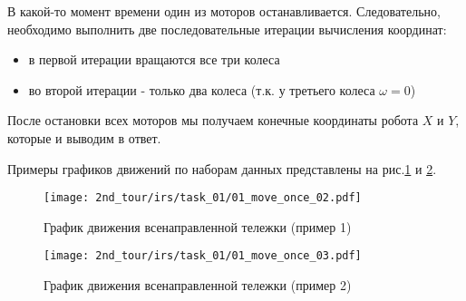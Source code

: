 В какой-то момент времени один из моторов останавливается. Следовательно, необходимо выполнить две последовательные итерации вычисления координат: 
\begin{itemize}
	\item в первой итерации вращаются все три колеса
	\item во второй итерации - только два колеса (т.к. у третьего колеса $\omega = 0$)
\end{itemize}

После остановки всех моторов мы получаем конечные координаты робота $X$ и $Y$, которые и выводим в ответ.

Примеры графиков движений по наборам данных представлены на рис.\ref{fig:01_move_once_02} и \ref{fig:01_move_once_03}.

\begin{figure}[h!]
	\centering
	\texttt{[image: 2nd\_tour/irs/task\_01/01\_move\_once\_02.pdf]}
	\caption{График движения всенаправленной тележки (пример 1)}
	\label{fig:01_move_once_02}
\end{figure}
\begin{figure}[h!]
	\centering
	\texttt{[image: 2nd\_tour/irs/task\_01/01\_move\_once\_03.pdf]}
	\caption{График движения всенаправленной тележки (пример 2)}
	\label{fig:01_move_once_03}
\end{figure}


\codeExample

{}
